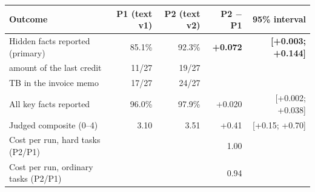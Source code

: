 \begin{tabular}{lrrrr}
\toprule
Outcome & P1 (text v1) & P2 (text v2) & P2 $-$ P1 & 95\% interval \\
\midrule
Hidden facts reported (primary) & 85.1\% & 92.3\% & \textbf{+0.072} & \textbf{[+0.003; +0.144]} \\
\quad amount of the last credit & 11/27 & 19/27 & & \\
\quad TB in the invoice memo & 17/27 & 24/27 & & \\
All key facts reported & 96.0\% & 97.9\% & +0.020 & [+0.002; +0.038] \\
Judged composite (0--4) & 3.10 & 3.51 & +0.41 & [+0.15; +0.70] \\
Cost per run, hard tasks (P2/P1) & & & 1.00 & \\
Cost per run, ordinary tasks (P2/P1) & & & 0.94 & \\
\bottomrule
\end{tabular}
